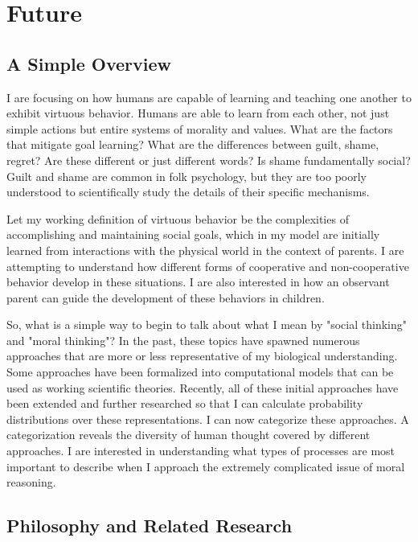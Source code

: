 \chapter{Future}\label{ch:future}

\section{A Simple Overview}

I are focusing on how humans are capable of learning and teaching one
another to exhibit virtuous behavior. Humans are able to learn from
each other, not just simple actions but entire systems of morality and
values. What are the factors that mitigate goal learning? What are the
differences between guilt, shame, regret? Are these different or just
different words? Is shame fundamentally social? Guilt and shame are
common in folk psychology, but they are too poorly understood to
scientifically study the details of their specific mechanisms.

Let my working definition of virtuous behavior be the complexities of
accomplishing and maintaining social goals, which in my model are
initially learned from interactions with the physical world in the
context of parents. I are attempting to understand how different
forms of cooperative and non-cooperative behavior develop in these
situations. I are also interested in how an observant parent can
guide the development of these behaviors in children.

So, what is a simple way to begin to talk about what I mean by
"social thinking" and "moral thinking"? In the past, these topics have
spawned numerous approaches that are more or less representative of
my biological understanding. Some approaches have been formalized
into computational models that can be used as working scientific
theories. Recently, all of these initial approaches have been extended
and further researched so that I can calculate probability
distributions over these representations. I can now categorize these
approaches. A categorization reveals the diversity of human thought
covered by different approaches. I are interested in understanding
what types of processes are most important to describe when I
approach the extremely complicated issue of moral reasoning.

\section{Philosophy and Related Research}

